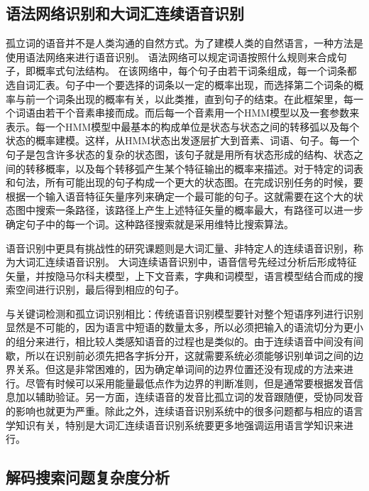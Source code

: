 \subsection{语法网络识别和大词汇连续语音识别}
\label{chap:intro-lvcsr}

孤立词的语音并不是人类沟通的自然方式。为了建模人类的自然语言，一种方法是使用语法网络来进行语音识别。
语法网络可以规定词语按照什么规则来合成句子，即概率式句法结构。
在该网络中，每个句子由若干词条组成，每一个词条都选自词汇表。句子中一个要选择的词条以一定的概率出现，而选择第二个词条的概率与前一个词条出现的概率有关，以此类推，直到句子的结束。在此框架里，每一个词语由若干个音素串接而成。而后每一个音素用一个HMM模型以及一套参数来表示。每一个HMM模型中最基本的构成单位是状态与状态之间的转移弧以及每个状态的概率建模。这样，从HMM状态出发逐层扩大到音素、词语、句子。每一个句子是包含许多状态的复杂的状态图，该句子就是用所有状态形成的结构、状态之间的转移概率，以及每个转移弧产生某个特征输出的概率来描述。对于特定的词表和句法，所有可能出现的句子构成一个更大的状态图。在完成识别任务的时候，要根据一个输入语音特征矢量序列来确定一个最可能的句子。这就需要在这个大的状态图中搜索一条路径，该路径上产生上述特征矢量的概率最大，有路径可以进一步确定句子中的每一个词。这种路径搜索就是采用维特比搜索算法。

语音识别中更具有挑战性的研究课题则是大词汇量、非特定人的连续语音识别，称为大词汇连续语音识别。
大词连续语音识别中，语音信号先经过分析后形成特征矢量，并按隐马尔科夫模型，上下文音素，字典和词模型，语言模型结合而成的搜索空间进行识别，最后得到相应的句子。

与关键词检测和孤立词识别相比：传统语音识别模型要针对整个短语序列进行识别显然是不可能的，因为语言中短语的数量太多，所以必须把输入的语流切分为更小的组分来进行，相比较人类感知语音的过程也是类似的。由于连续语音中间没有间歇，所以在识别前必须先把各字拆分开，这就需要系统必须能够识别单词之间的边界关系。但这是非常困难的，因为确定单词间的边界位置还没有现成的方法来进行。尽管有时候可以采用能量最低点作为边界的判断准则，但是通常要根据发音信息加以辅助验证。另一方面，连续语音的发音比孤立词的发音跟随便，受协同发音的影响也就更为严重。除此之外，连续语音识别系统中的很多问题都与相应的语言学知识有关，特别是大词汇连续语音识别系统要更多地强调运用语言学知识来进行。

\subsection{解码搜索问题复杂度分析}
\label{chap:intro-lvcsr-complex}

